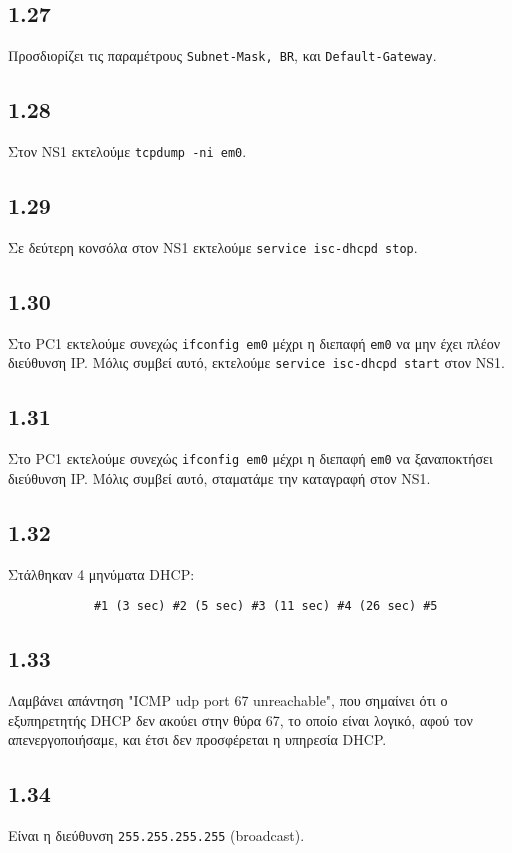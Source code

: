 \documentclass[a4paper, 12pt]{article}
\begin{document}
	\subsection*{1.27}
		Προσδιορίζει τις παραμέτρους \verb|Subnet-Mask, BR|, και  \verb|Default-Gateway|.
	
	\subsection*{1.28}
		Στον NS1 εκτελούμε \verb|tcpdump -ni em0|.
	
	\subsection*{1.29}
		Σε δεύτερη κονσόλα στον NS1 εκτελούμε \verb|service isc-dhcpd stop|.
	
	\subsection*{1.30}
		Στο PC1 εκτελούμε συνεχώς \verb|ifconfig em0| μέχρι η διεπαφή \verb|em0| να μην έχει πλέον διεύθυνση IP. Μόλις συμβεί αυτό, εκτελούμε \verb|service isc-dhcpd start| στον NS1.
	
	\subsection*{1.31}
		Στο PC1 εκτελούμε συνεχώς \verb|ifconfig em0| μέχρι η διεπαφή \verb|em0| να ξαναποκτήσει διεύθυνση IP. Μόλις συμβεί αυτό, σταματάμε την καταγραφή στον NS1.
	
	\subsection*{1.32}
		Στάλθηκαν 4 μηνύματα DHCP:
		
		\begin{verbatim}
			#1 (3 sec) #2 (5 sec) #3 (11 sec) #4 (26 sec) #5			
		\end{verbatim}
	
	\subsection*{1.33}
		Λαμβάνει απάντηση "ICMP udp port 67 unreachable", που σημαίνει ότι ο εξυπηρετητής DHCP δεν ακούει στην θύρα 67, το οποίο είναι λογικό, αφού τον απενεργοποιήσαμε, και έτσι δεν προσφέρεται η υπηρεσία DHCP.
	
	\subsection*{1.34}
		Είναι η διεύθυνση \verb|255.255.255.255| (broadcast).
	
\end{document}
